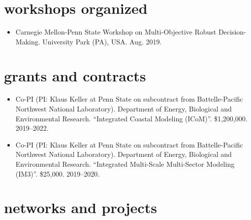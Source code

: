 \documentclass[11pt,article,oneside]{memoir}
\begin{document}

\section{workshops organized}

\mbox{}\vspace{-\dimexpr\baselineskip\relax}

\begin{itemize}[label={}]

\item Carnegie Mellon-Penn State Workshop on Multi-Objective Robust Decision-Making. University Park (PA), USA. Aug. 2019.

\end{itemize}


\section{grants and contracts}

\mbox{}\vspace{-\dimexpr\baselineskip\relax}

\begin{itemize}[label={}]

\item Co-PI (PI: Klaus Keller at Penn State on subcontract from Battelle-Pacific Northwest National Laboratory). Department of Energy, Biological and Environmental Research. \enquote{Integrated Coastal Modeling (ICoM)}. \$1,200,000. 2019--2022.

\item Co-PI (PI: Klaus Keller at Penn State on subcontract from Battelle-Pacific Northwest National Laboratory). Department of Energy, Biological and Environmental Research. \enquote{Integrated Multi-Scale Multi-Sector Modeling (IM3)}. \$25,000. 2019--2020.

\end{itemize}


\section{networks and projects}

\mbox{}\vspace{-\dimexpr\baselineskip\relax}
\end{document}
